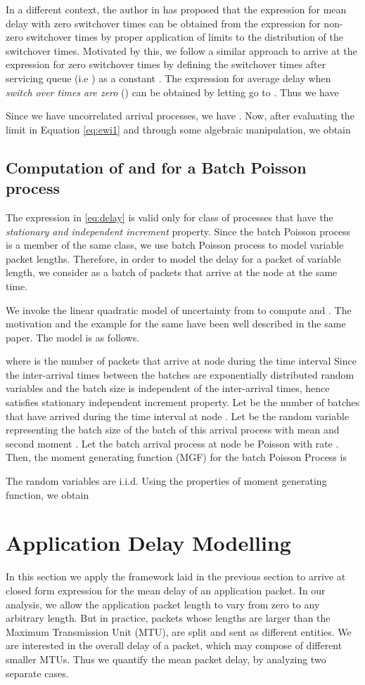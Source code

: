 \documentclass[10pt, conference, compsocconf]{IEEEtran}
\begin{document}
In a different context, the author in \cite{levy} has proposed that the expression for mean delay with zero switchover times can be obtained from the expression for non-zero switchover times by proper application of limits to the distribution of the switchover times. Motivated by this, we follow a similar approach to arrive at the expression for zero switchover times by defining the switchover times after servicing queue  (i.e ) as a constant . The expression for average delay when \emph{switch over times are zero} () can be obtained by letting  go to . Thus we have 

Since we have uncorrelated arrival processes, we have . Now, after evaluating the limit in Equation \eqref{eq:ewi1} and through some algebraic manipulation, we obtain


\subsection{Computation of  and  for a Batch Poisson process}
The expression in \eqref{eq:delay} is valid only for class of processes that have the \emph{stationary and independent increment} property. Since the batch Poisson process is a member of the same class, we use batch Poisson process to model variable packet lengths. Therefore, in order to model the delay for a packet of variable length, we consider as a batch of packets that arrive at the node at the same time. 

We invoke the linear quadratic model of uncertainty from \cite{lee} to compute  and . The motivation and the example for the same have been well described in the same paper. The model is as follows.

where  is the number of packets that arrive at node  during the time interval  Since the inter-arrival times between the batches are exponentially distributed random variables and the batch size is independent of the inter-arrival times, hence  satisfies stationary independent increment property. Let  be the number of batches that have arrived during the time interval  at node . Let  be the random variable representing the batch size of the  batch of this arrival process with mean  and second moment . Let the batch arrival process at node  be Poisson with rate . Then, the moment generating function (MGF) for the batch Poisson Process is

The random variables  are i.i.d. Using the properties of moment generating function, we obtain


\section{\large{Application Delay Modelling}}
\label{analysis}
In this section we apply the framework laid in the previous section to arrive at closed form expression for the mean delay of an application packet. In our analysis, we allow the application packet length to vary from zero to any arbitrary length. But in practice, packets whose lengths are larger than the Maximum Transmission Unit (MTU), are split and sent as different entities. We are interested in the overall delay of a packet, which may compose of different smaller MTUs. Thus we quantify the mean packet delay, by analyzing two separate cases.
\end{document}
